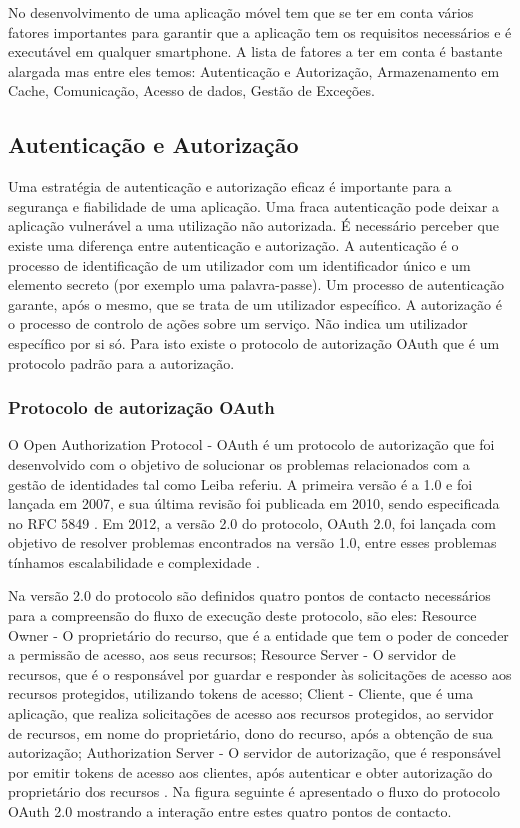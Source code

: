 \documentclass[11pt,twoside,a4paper]{report}
\begin{document}
No desenvolvimento de uma aplicação móvel tem que se ter em conta vários fatores importantes para garantir que a aplicação tem os requisitos necessários e é executável em qualquer smartphone. A lista de fatores a ter em conta é bastante alargada mas entre eles temos: Autenticação e Autorização, Armazenamento em Cache, Comunicação, Acesso de dados, Gestão de Exceções. \cite{mobileappbook}

\subsection{Autenticação e Autorização}

Uma estratégia de autenticação e autorização eficaz é importante para a segurança e fiabilidade de uma aplicação. Uma fraca autenticação pode deixar a aplicação vulnerável a uma utilização não autorizada. É necessário perceber que existe uma diferença entre autenticação e autorização. A autenticação é o processo de identificação de um utilizador com um identificador único e um elemento secreto (por exemplo uma palavra-passe). Um processo de autenticação garante, após o mesmo, que se trata de um utilizador específico. A autorização é o processo de controlo de ações sobre um serviço. Não indica um utilizador específico por si só. Para isto existe o protocolo de autorização OAuth que é um protocolo padrão para a autorização.\cite{oauth20}

\subsubsection{Protocolo de autorização OAuth}
O Open Authorization Protocol - OAuth é um protocolo de autorização que foi desenvolvido com o objetivo de solucionar os problemas relacionados com a gestão de identidades tal como Leiba \cite{leiba_oauth} referiu.
 A primeira versão é a 1.0 e foi lançada em 2007, e sua última revisão foi publicada em 2010, sendo especificada no \gls{RFC} 5849 \cite{oauth10}. Em 2012, a versão 2.0 do protocolo, OAuth 2.0, foi lançada com objetivo de resolver problemas encontrados
na versão 1.0, entre esses problemas tínhamos escalabilidade e complexidade \cite{oauth20}.
\par
Na versão 2.0 do protocolo são definidos quatro pontos de contacto necessários para a compreensão do fluxo de execução deste protocolo, são eles: Resource Owner - O proprietário do recurso, que é a entidade que tem o poder de conceder a permissão de acesso, aos seus recursos; Resource Server - O servidor de recursos, que é o responsável por guardar e responder às solicitações de acesso aos recursos protegidos, utilizando tokens de acesso; Client - Cliente, que é uma aplicação, que realiza solicitações de acesso aos recursos protegidos, ao servidor de recursos, em nome do proprietário, dono do recurso, após a obtenção de sua autorização; Authorization Server - O servidor de autorização, que é responsável por emitir tokens de acesso aos clientes, após autenticar e obter autorização do proprietário dos recursos \cite{oauth20}. Na figura seguinte é apresentado o fluxo do protocolo OAuth 2.0 mostrando a interação entre estes quatro pontos de contacto.
\end{document}
